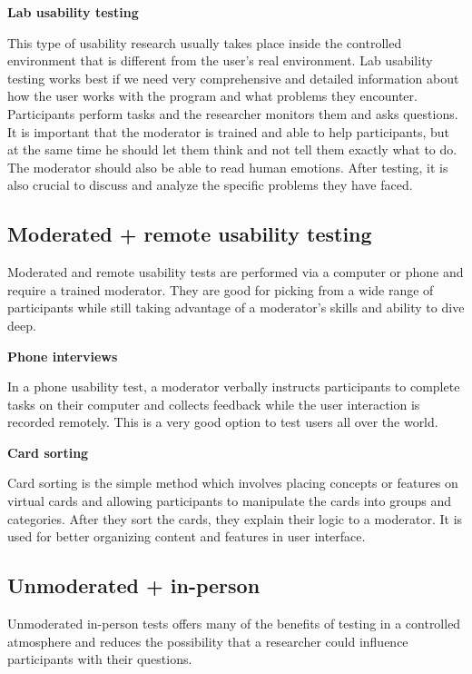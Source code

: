 \documentclass[a4paper,10pt,twoside]{article}
\begin{document}
\smallskip

\noindent \textbf {Lab usability testing}

\noindent This type of usability research usually takes place inside the controlled environment that is different from the user’s real environment. 
Lab usability testing works best if we need very comprehensive and detailed information about how the user works with the program and what problems they encounter. Participants perform tasks and the researcher monitors them and asks questions. It is important that the moderator is trained and able to help participants, but at the same time he should let them think and not tell them exactly what to do. The moderator should also be able to read human emotions. After testing, it is also crucial to discuss and analyze the specific problems they have faced.

\subsection{Moderated + remote usability testing}
Moderated and remote usability tests are performed via a computer or phone and require a trained moderator. They are good for picking from a wide range of participants while still taking advantage of a moderator's skills and ability to dive deep.

\smallskip

\noindent \textbf {Phone interviews}

\noindent In a phone usability test, a moderator verbally instructs participants to complete tasks on their computer and collects feedback while the user interaction is recorded remotely. This is a very good option to test users all over the world. 

\smallskip

\noindent \textbf {Card sorting}

\noindent Card sorting is the simple method which involves placing concepts or features on virtual cards and allowing participants to manipulate the cards into groups and categories. After they sort the cards, they explain their logic to a moderator. It is used for better organizing content and features in user interface.

\subsection {Unmoderated + in-person}
Unmoderated in-person tests offers many of the benefits of testing in a controlled atmosphere and reduces the possibility that a researcher could influence participants with their questions.
\end{document}
